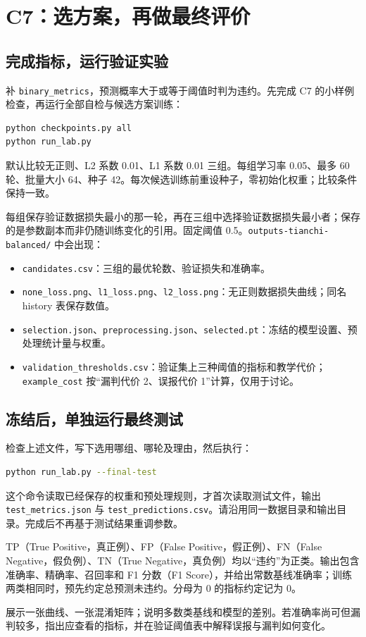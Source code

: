 \documentclass[UTF8,a4paper,11pt,fontset=fandol]{ctexart}
\newcommand{\file}[1]{\nolinkurl{#1}}
\begin{document}
\section{C7：选方案，再做最终评价}
\subsection{完成指标，运行验证实验}
补 \texttt{binary\_metrics}，预测概率大于或等于阈值时判为违约。先完成 C7 的小样例检查，再运行全部自检与候选方案训练：
\begin{lstlisting}[language=bash]
python checkpoints.py all
python run_lab.py
\end{lstlisting}
默认比较无正则、L2 系数 0.01、L1 系数 0.01 三组。每组学习率 0.05、最多 60 轮、批量大小 64、种子 42。每次候选训练前重设种子，零初始化权重；比较条件保持一致。

每组保存验证数据损失最小的那一轮，再在三组中选择验证数据损失最小者；保存的是参数副本而非仍随训练变化的引用。固定阈值 0.5。\file{outputs-tianchi-balanced/} 中会出现：
\begin{itemize}
\item \file{candidates.csv}：三组的最优轮数、验证损失和准确率。
\item \file{none_loss.png}、\file{l1_loss.png}、\file{l2_loss.png}：无正则数据损失曲线；同名 history 表保存数值。
\item \file{selection.json}、\file{preprocessing.json}、\file{selected.pt}：冻结的模型设置、预处理统计量与权重。
\item \file{validation_thresholds.csv}：验证集上三种阈值的指标和教学代价；\texttt{example\_cost} 按“漏判代价 2、误报代价 1”计算，仅用于讨论。
\end{itemize}
\subsection{冻结后，单独运行最终测试}
检查上述文件，写下选用哪组、哪轮及理由，然后执行：
\begin{lstlisting}[language=bash]
python run_lab.py --final-test
\end{lstlisting}
这个命令读取已经保存的权重和预处理规则，才首次读取测试文件，输出 \file{test_metrics.json} 与 \file{test_predictions.csv}。请沿用同一数据目录和输出目录。完成后不再基于测试结果重调参数。

TP（True Positive，真正例）、FP（False Positive，假正例）、FN（False Negative，假负例）、TN（True Negative，真负例）均以“违约”为正类。输出包含准确率、精确率、召回率和 F1 分数（F1 Score），并给出常数基线准确率；训练两类相同时，预先约定总预测未违约。分母为 0 的指标约定记为 0。
\begin{questionbox}[验收证据]
展示一张曲线、一张混淆矩阵；说明多数类基线和模型的差别。若准确率尚可但漏判较多，指出应查看的指标，并在验证阈值表中解释误报与漏判如何变化。
\end{questionbox}
\clearpage
\end{document}
